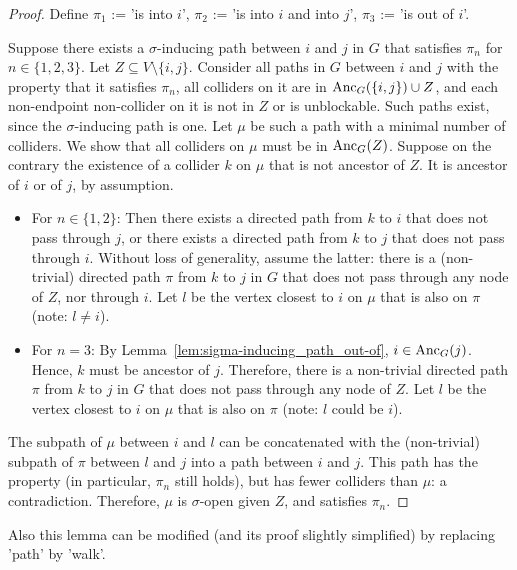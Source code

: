 \begin{proof}
  Define $\pi_1$ := 'is into $i$', $\pi_2$ := 'is into $i$ and into $j$', $\pi_3$ := 'is out of $i$'.

  Suppose there exists a $\sigma$-inducing path between $i$ and $j$ in $G$ that satisfies $\pi_n$ for $n \in \{1,2,3\}$.
  Let $Z \subseteq V\setminus\{i,j\}$. 
  Consider all paths in $G$ between $i$ and $j$ with the property that it satisfies $\pi_n$, all colliders on it are in $\mathrm{Anc}_{G}({\{i,j\}) \cup Z}$, and each non-endpoint non-collider on it is not in $Z$ or is unblockable.
  Such paths exist, since the $\sigma$-inducing path is one. 
  Let $\mu$ be such a path with a minimal number of colliders.
  We show that all colliders on $\mu$ must be in $\mathrm{Anc}_{G}(Z)$. 
  Suppose on the contrary the existence of a collider $k$ on $\mu$ that is not ancestor of $Z$. 
  It is ancestor of $i$ or of $j$, by assumption.

  \begin{itemize}
    \item For $n\in \{1,2\}$:
  Then there exists a directed path from $k$ to $i$ that does not pass through $j$, or there exists a directed path from $k$ to $j$ that does not pass through $i$.
  Without loss of generality, assume the latter:
  there is a (non-trivial) directed path $\pi$ from $k$ to $j$ in $G$ that does not pass through any node of $Z$, nor through $i$.
  Let $l$ be the vertex closest to $i$ on $\mu$ that is also on $\pi$ (note: $l \ne i$).
    \item For $n = 3$:
  By Lemma~\ref{lem:sigma-inducing_path_out-of}, $i \in \mathrm{Anc}_G(j)$.
  Hence, $k$ must be ancestor of $j$.
  Therefore, there is a non-trivial directed path $\pi$ from $k$ to $j$ in $G$ that does not pass through any node of $Z$.
  Let $l$ be the vertex closest to $i$ on $\mu$ that is also on $\pi$ (note: $l$ could be $i$).
  \end{itemize}

  The subpath of $\mu$ between $i$ and $l$ can be concatenated with the (non-trivial) subpath of $\pi$ between $l$ and $j$ into a path between $i$ and $j$.
  This path has the property (in particular, $\pi_n$ still holds), but has fewer colliders than $\mu$: a contradiction.
  Therefore, $\mu$ is $\sigma$-open given $Z$, and satisfies $\pi_n$.
\end{proof}
Also this lemma can be modified (and its proof slightly simplified) by replacing 'path' by 'walk'.

